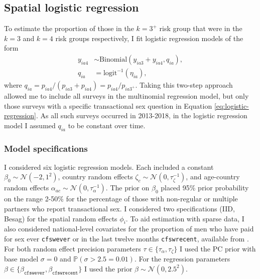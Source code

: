 \documentclass[a4paper, nobind]{templates/ociamthesis}
\begin{document}
\hypertarget{s-logistic}{%
\subsection{Spatial logistic regression}\label{s-logistic}}

To estimate the proportion of those in the \(k = 3^{+}\) risk group that were in the \(k = 3\) and \(k = 4\) risk groups respectively, I fit logistic regression models of the form
\begin{align}
    y_{ia4} &\sim \text{Binomial} \left( y_{ia3} + y_{ia4}, q_{ia} \right), \label{eq:logistic-regression} \\
    q_{ia} &= \text{logit}^{-1} \left( \eta_{ia} \right), 
\end{align}
where \(q_{ia} = p_{ia4} / (p_{ia3} + p_{ia4}) = p_{ia4} / p_{ia{3^+}}\).
Taking this two-step approach allowed me to include all surveys in the multinomial regression model, but only those surveys with a specific transactional sex question in Equation \eqref{eq:logistic-regression}.
As all such surveys occurred in 2013-2018, in the logistic regression model I assumed \(q_{ia}\) to be constant over time.

\hypertarget{model-specifications-1}{%
\subsubsection{Model specifications}\label{model-specifications-1}}

I considered six logistic regression models.
Each included a constant \(\beta_0 \sim \mathcal{N}(-2, 1^2)\), country random effects \(\zeta_{c} \sim \mathcal{N}(0, \tau_\zeta^{-1})\), and age-country random effects \(\alpha_{ac} \sim \mathcal{N}(0, \tau_\alpha^{-1})\).
The prior on \(\beta_0\) placed 95\% prior probability on the range 2-50\% for the percentage of those with non-regular or multiple partners who report transactional sex.
I considered two specifications (IID, Besag) for the spatial random effects \(\phi_i\).
To aid estimation with sparse data, I also considered national-level covariates for the proportion of men who have paid for sex ever \texttt{cfswever} or in the last twelve months \texttt{cfswrecent}, available from \textcite{hodgins2022population}.
For both random effect precision parameters \(\tau \in \{\tau_\alpha, \tau_\zeta\}\) I used the PC prior with base model \(\sigma = 0\) and \(\mathbb{P}(\sigma > 2.5 = 0.01)\).
For the regression parameters \(\beta \in \{\beta_\texttt{cfswever}, \beta_\texttt{cfswrecent}\}\) I used the prior \(\beta \sim \mathcal{N}(0, 2.5^2)\).
\end{document}
